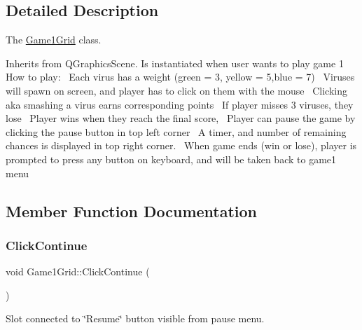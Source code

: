 \subsection{Detailed Description}
The \hyperlink{classGame1Grid}{Game1\+Grid} class. 

Inherits from Q\+Graphics\+Scene. Is instantiated when user wants to play game 1~\newline
 How to play\+:~\newline
Each virus has a weight (green = 3, yellow = 5,blue = 7)~\newline
Viruses will spawn on screen, and player has to click on them with the mouse~\newline
Clicking aka smashing a virus earns corresponding points~\newline
If player misses 3 viruses, they lose~\newline
Player wins when they reach the final score,~\newline
Player can pause the game by clicking the pause button in top left corner~\newline
A timer, and number of remaining chances is displayed in top right corner.~\newline
When game ends (win or lose), player is prompted to press any button on keyboard, and will be taken back to game1 menu~\newline


\subsection{Member Function Documentation}
\mbox{\label{classGame1Grid_a82311dcf0ee4d0c41b413e4eb622a695}} 
\subsubsection{\texorpdfstring{Click\+Continue}{ClickContinue}}
{\footnotesize\ttfamily void Game1\+Grid\+::\+Click\+Continue (\begin{DoxyParamCaption}{ }\end{DoxyParamCaption})\hspace{0.3cm}{\ttfamily [slot]}}



Slot connected to \char`\"{}\+Resume\char`\"{} button visible from pause menu. 

